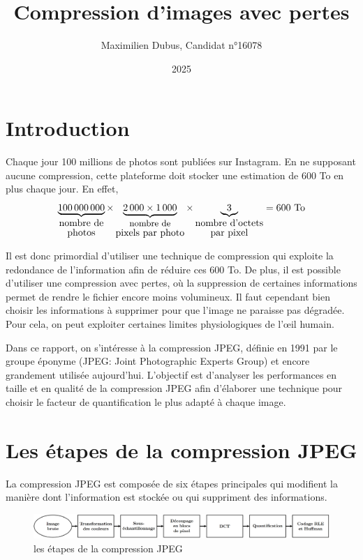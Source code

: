 \documentclass{article}
\title{Compression d'images avec pertes}
\author{Maximilien Dubus, Candidat n°16078}
\date{2025}
\begin{document}
\maketitle


\section{Introduction}

Chaque jour 100 millions de photos sont publiées sur Instagram. En ne supposant aucune compression, cette plateforme doit stocker une estimation de 600 To en plus chaque jour.
En effet,    
\[
        \underbrace{100\,000\,000}_{\shortstack{\text{nombre de}\\\text{photos}}}
        \times
        \underbrace{2\,000 \times 1\,000}_{\shortstack{\text{\small nombre de}\\\text{pixels par photo}}}
        \times
        \underbrace{3}_{\shortstack{\text{nombre d'octets}\\\text{par pixel}}}
        =  600\ \text{To}
\]

Il est donc primordial d'utiliser une technique de compression qui exploite la redondance de l’information afin de réduire ces 600 To. De plus, il est possible d'utiliser une compression avec pertes, où la suppression de certaines informations permet de rendre le fichier encore moins volumineux. Il faut cependant bien choisir les informations à supprimer pour que l’image ne paraisse pas dégradée. Pour cela, on peut exploiter certaines limites physiologiques de l’œil humain.

Dans ce rapport, on s’intéresse à la compression JPEG, définie en 1991 par le groupe éponyme (JPEG: Joint Photographic Experts Group) et encore grandement utilisée aujourd'hui. L'objectif est d'analyser les performances en taille et en qualité de la compression JPEG afin d'élaborer une technique pour choisir le facteur de quantification le plus adapté à chaque image.

\section{Les étapes de la compression JPEG}

La compression JPEG est composée de six étapes principales qui modifient la manière dont l'information est stockée ou qui suppriment des informations.
\begin{figure}[H]
    \centering
    \includegraphics[width=1\linewidth]{etapes.png}
    \caption{les étapes de la compression JPEG}
\end{figure}
\end{document}
